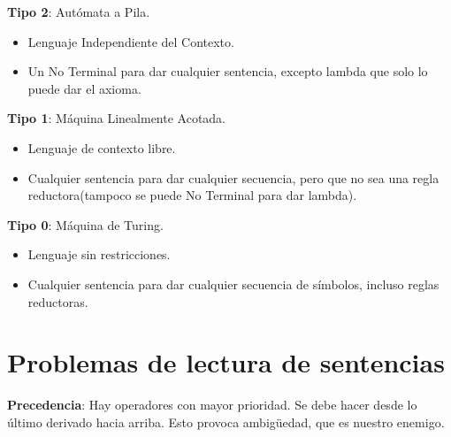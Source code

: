 \documentclass[12pt, twoside, openright]{report} %
\begin{document}
\textbf{Tipo 2}: Autómata a Pila.

\begin{itemize}
\item
  Lenguaje Independiente del Contexto.
\item
  Un No Terminal para dar cualquier sentencia, excepto lambda que solo
  lo puede dar el axioma.
\end{itemize}

\textbf{Tipo 1}: Máquina Linealmente Acotada.

\begin{itemize}
\item
  Lenguaje de contexto libre.
\item
  Cualquier sentencia para dar cualquier secuencia, pero que no sea una
  regla reductora(tampoco se puede No Terminal para dar lambda).
\end{itemize}

\textbf{Tipo 0}: Máquina de Turing.

\begin{itemize}
\item
  Lenguaje sin restricciones.
\item
  Cualquier sentencia para dar cualquier secuencia de símbolos, incluso
  reglas reductoras.
\end{itemize}

\section{Problemas de lectura de sentencias}

\textbf{Precedencia}: Hay operadores con mayor prioridad. Se debe hacer
desde lo último derivado hacia arriba. Esto provoca ambigüedad, que es
nuestro enemigo.
\end{document}
